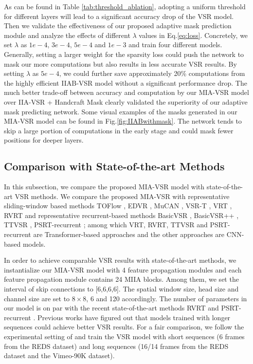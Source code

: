 \documentclass[10pt,twocolumn,letterpaper]{article}
\begin{document}
As can be found in Table \ref{tab:threshold_ablation}, adopting a uniform threshold for different layers will lead to a significant accuracy drop of the VSR model.
%
Then we validate the effectiveness of our proposed adaptive mask prediction module and analyze the effects of different $\lambda$ values in Eq.\ref{eq:loss}.
%
Concretely, we set $\lambda$ as $1e-4$, $3e-4$, $5e-4$ and $1e-3$ and train four different models.
%
Generally, setting a larger weight for the sparsity loss could push the network to mask our more computations but also results in less accurate VSR results.
%
By setting $\lambda$ as $5e-4$, we could further save approximately 20\% computations from the highly efficient IIAB-VSR model without a significant performance drop.
%
The much better trade-off between accuracy and computation by our MIA-VSR model over IIA-VSR + Handcraft Mask clearly validated the superiority of our adaptive mask predicting network.
%
Some visual examples of the masks generated in our MIA-VSR model can be found in Fig.\ref{fig:IIABwithmask}.
%
The network tends to skip a large portion of computations in the early stage and could mask fewer positions for deeper layers.
\subsection{Comparison with State-of-the-art  Methods}
In this subsection, we compare the proposed MIA-VSR model with state-of-the-art VSR methods.
We compare the proposed MIA-VSR with representative sliding-window based methods TOFlow \cite{xue2019video}, EDVR \cite{wang2019edvr}, MuCAN \cite{li2020mucan}, VSR-T \cite{cao2021video}, VRT \cite{liang2022vrt}, RVRT \cite{liang2022recurrent} and representative recurrent-based methods BasicVSR \cite{chan2020basicvsr},  BasicVSR++ \cite{chan2022basicvsr++}, TTVSR \cite{liu2022learning}, PSRT-recurrent \cite{shi2022rethinking}; among which VRT, RVRT, TTVSR and PSRT-recurrent are Transformer-based approaches and the other approaches are CNN-based models. 

In order to achieve comparable VSR results with state-of-the-art methods, we instantialize our MIA-VSR model with 4 feature propagation modules and each feature propagation module contains 24 MIIA blocks. 
%
Among them, we set the interval of skip connections to [6,6,6,6].
%
The spatial window size, head size and channel size are set to $8\times 8$, 6 and 120 accordingly.
%
The number of parameters in our model is on par with the recent state-of-the-art methods RVRT \cite{liang2022recurrent} and PSRT-recurrent \cite{shi2022rethinking}.
%
Previous works \cite{liang2022vrt,liang2022recurrent, shi2022rethinking,liu2022learning,qiu2022learning} have figured out that models trained with longer sequences could achieve better VSR results.
%
For a fair comparison, we follow the experimental setting of \cite{liang2022recurrent,shi2022rethinking,liang2022vrt} and train the VSR model with short sequences (6 frames from the REDS dataset) and long sequences (16/14 frames from the REDS dataset and the Vimeo-90K dataset). 
%
\end{document}
